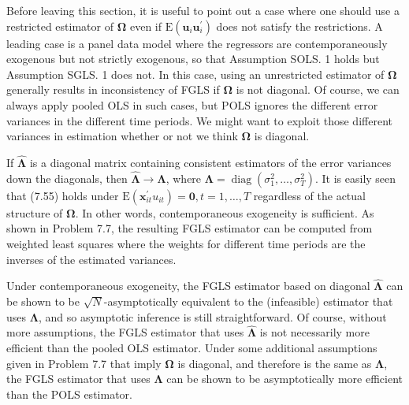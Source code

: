 \documentclass[10pt]{article}
\begin{document}
Before leaving this section, it is useful to point out a case where one should use a restricted estimator of $\boldsymbol{\Omega}$ even if $\mathrm{E}\left(\mathbf{u}_{i} \mathbf{u}_{i}^{\prime}\right)$ does not satisfy the restrictions. A leading case is a panel data model where the regressors are contemporaneously exogenous but not strictly exogenous, so that Assumption SOLS. 1 holds but Assumption SGLS. 1 does not. In this case, using an unrestricted estimator of $\boldsymbol{\Omega}$ generally results in inconsistency of FGLS if $\boldsymbol{\Omega}$ is not diagonal. Of course, we can always apply pooled OLS in such cases, but POLS ignores the different error variances in the different time periods. We might want to exploit those different variances in estimation whether or not we think $\boldsymbol{\Omega}$ is diagonal.

If $\hat{\boldsymbol{\Lambda}}$ is a diagonal matrix containing consistent estimators of the error variances down the diagonals, then $\hat{\boldsymbol{\Lambda}} \rightarrow \boldsymbol{\Lambda}$, where $\boldsymbol{\Lambda}=\operatorname{diag}\left(\sigma_{1}^{2}, \ldots, \sigma_{T}^{2}\right)$. It is easily seen that (7.55) holds under $\mathrm{E}\left(\mathbf{x}_{i t}^{\prime} u_{i t}\right)=\mathbf{0}, t=1, \ldots, T$ regardless of the actual structure of $\boldsymbol{\Omega}$. In other words, contemporaneous exogeneity is sufficient. As shown in Problem 7.7, the resulting FGLS estimator can be computed from weighted least squares where the weights for different time periods are the inverses of the estimated variances.

Under contemporaneous exogeneity, the FGLS estimator based on diagonal $\hat{\boldsymbol{\Lambda}}$ can be shown to be $\sqrt{N}$-asymptotically equivalent to the (infeasible) estimator that uses $\boldsymbol{\Lambda}$, and so asymptotic inference is still straightforward. Of course, without more assumptions, the FGLS estimator that uses $\hat{\boldsymbol{\Lambda}}$ is not necessarily more efficient than the pooled OLS estimator. Under some additional assumptions given in Problem 7.7 that imply $\boldsymbol{\Omega}$ is diagonal, and therefore is the same as $\boldsymbol{\Lambda}$, the FGLS estimator that uses $\boldsymbol{\Lambda}$ can be shown to be asymptotically more efficient than the POLS estimator.
\end{document}
